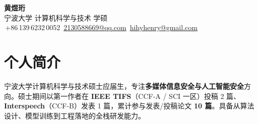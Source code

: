 \documentclass[a4paper,10pt]{article}
\newcommand{\contactitem}[2]{\raisebox{-0.15ex}{#1}\,#2}
\begin{document}

\begin{center}
    {\Huge\bfseries\color{themecolor} 黄煜珩}\\[6pt]
    {\large\color{lightgray} 宁波大学\,\textbar\,计算机科学与技术\,\textbar\,学硕}\\[8pt]
    {\small\color{themecolor}
    \contactitem{\faPhone}{+86\,139\,6232\,0052} \quad
    \contactitem{\faEnvelope}{\href{mailto:2130588669@qq.com}{2130588669@qq.com}} \quad
    \contactitem{\faEnvelope}{\href{mailto:hihyhenry@gmail.com}{hihyhenry@gmail.com}}
    }
\end{center}


\section{个人简介}

\begin{minipage}[t]{\textwidth}
\vspace{2pt}
宁波大学计算机科学与技术硕士应届生，专注\textbf{多媒体信息安全与人工智能安全}方向。硕士期间以第一作者在 \textbf{IEEE TIFS}（CCF-A / SCI 一区）投稿 2 篇、\textbf{Interspeech}（CCF-B）发表 1 篇，累计参与发表/投稿论文 \textbf{10 篇}。具备从算法设计、模型训练到工程落地的全栈研发能力。
\vspace{8pt}
\end{minipage}
\end{document}
